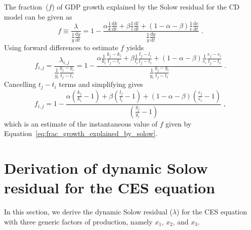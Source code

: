 \documentclass[preprint,authoryear,12pt]{elsarticle}\usepackage[]{graphicx}\usepackage[]{color}
\begin{document}
The fraction~($f$) of GDP growth explained by the Solow residual
for the CD model
can be given as
%
\begin{equation} \label{eq:frac_growth_explained_by_solow}
  f \equiv \frac{\lambda}{\frac{1}{y}\frac{\mathrm{d}y}{\mathrm{d}t}} 
            = 1 - \frac{\alpha \frac{1}{k}\frac{\mathrm{d}k}{\mathrm{d}t} 
                      + \beta \frac{1}{l}\frac{\mathrm{d}l}{\mathrm{d}t} 
                      + (1 - \alpha - \beta) \frac{1}{e}\frac{\mathrm{d}e}{\mathrm{d}t}}
                  {\frac{1}{y}\frac{\mathrm{d}y}{\mathrm{d}t}} \; .
\end{equation}
%
Using forward differences to estimate $f$ yields
%
\begin{equation} \label{eq:f_finite_diff_1}
  f_{i,j} = \frac{\lambda_{i,j}}{\frac{1}{y_i}\frac{y_j - y_i}{t_j - t_i}}
       = 1 - \frac{\alpha \frac{1}{k_i}\frac{k_j - k_i}{t_j - t_i} 
            + \beta \frac{1}{l_i}\frac{l_j - l_i}{t_j - t_i} 
            + (1 - \alpha - \beta) \frac{1}{e_i}\frac{e_j - e_i}{t_j - t_i} }
            {\frac{1}{y_i}\frac{y_j - y_i}{t_j - t_i}} \; .
\end{equation}
%
Cancelling $t_j - t_i$ terms and simplifying gives
%
\begin{equation} \label{eq:f_finite_diff_2}
  f_{i,j} = 1 - \frac{\alpha \left( \frac{k_j}{k_i} - 1 \right) 
                      + \beta \left( \frac{l_j}{l_i} - 1 \right)
                      + (1 - \alpha - \beta) \left( \frac{e_j}{e_i} - 1 \right)}
            {\left( \frac{y_j}{y_i} - 1 \right)} \; ,
\end{equation}
%
which is an estimate of the instantaneous value of $f$ 
given by Equation~\ref{eq:frac_growth_explained_by_solow}.


\section{Derivation of dynamic Solow residual for the CES equation}
\label{sec:dynamic_sr_CES}

In this section, we derive the dynamic Solow residual ($\lambda$) 
for the CES equation with three generic factors of production, namely
$x_1$, $x_2$, and $x_3$.
\end{document}
